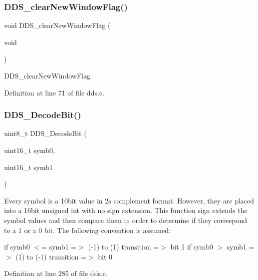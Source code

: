 \subsubsection{\texorpdfstring{D\+D\+S\+\_\+clear\+New\+Window\+Flag()}{DDS\_clearNewWindowFlag()}}
{\footnotesize\ttfamily void D\+D\+S\+\_\+clear\+New\+Window\+Flag (\begin{DoxyParamCaption}\item[{void}]{ }\end{DoxyParamCaption})}

D\+D\+S\+\_\+clear\+New\+Window\+Flag 

Definition at line 71 of file dds.\+c.

\mbox{\label{group___d_d_s___a_p_i_ga249a36f3fa12baff1cf03b7f6a8a0cac}} 
\subsubsection{\texorpdfstring{D\+D\+S\+\_\+\+Decode\+Bit()}{DDS\_DecodeBit()}}
{\footnotesize\ttfamily uint8\+\_\+t D\+D\+S\+\_\+\+Decode\+Bit (\begin{DoxyParamCaption}\item[{uint16\+\_\+t}]{symb0,  }\item[{uint16\+\_\+t}]{symb1 }\end{DoxyParamCaption})}

Every symbol is a 10bit value in 2\textquotesingle{}s complement format. However, they are placed into a 16bit unsigned int with no sign extension. This function sign extends the symbol values and then compare them in order to determine if they correspond to a 1 or a 0 bit. The following convention is assumed\+:

if symb0 $<$= symb1 =$>$ (-\/1) to (1) transition =$>$ bit 1 if symb0 $>$ symb1 =$>$ (1) to (-\/1) transition =$>$ bit 0 

Definition at line 285 of file dds.\+c.

\mbox{\label{group___d_d_s___a_p_i_gadafd1ef25b1e3bff8f5975e3001244c0}} 
